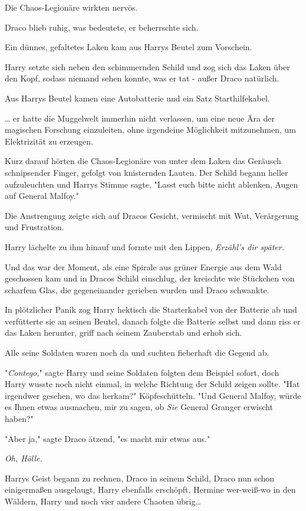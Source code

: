 {Die Chaos-Legionäre wirkten nervös.

Draco blieb ruhig, was bedeutete, er beherrschte sich.

Ein dünnes, gefaltetes Laken kam aus Harrys Beutel zum Vorschein.

Harry setzte sich neben den schimmernden Schild und zog sich das Laken über den Kopf, sodass niemand sehen konnte, was er tat - außer Draco natürlich.

Aus Harrys Beutel kamen eine Autobatterie und ein Satz Starthilfekabel.

… er hatte die Muggelwelt immerhin nicht verlassen, um eine neue Ära der magischen Forschung einzuleiten, ohne irgendeine Möglichkeit mitzunehmen, um Elektrizität zu erzeugen.

Kurz darauf hörten die Chaos-Legionäre von unter dem Laken das Geräusch schnipsender Finger, gefolgt von knisternden Lauten. Der Schild begann heller aufzuleuchten und Harrys Stimme sagte, "Lasst euch bitte nicht ablenken, Augen auf General Malfoy."

Die Anstrengung zeigte sich auf Dracos Gesicht, vermischt mit Wut, Verärgerung und Frustration.

Harry lächelte zu ihm hinauf und formte mit den Lippen, \emph{Erzähl's dir später.}

Und das war der Moment, als eine Spirale aus grüner Energie aus dem Wald geschossen kam und in Dracos Schild einschlug, der kreischte wie Stückchen von scharfem Glas, die gegeneinander gerieben wurden und Draco schwankte.

In plötzlicher Panik zog Harry hektisch die Starterkabel von der Batterie ab und verfütterte sie an seinen Beutel, danach folgte die Batterie selbst und dann riss er das Laken herunter, griff nach seinem Zauberstab und erhob sich.

Alle seine Soldaten waren noch da und suchten fieberhaft die Gegend ab.

"\emph{Contego,}" sagte Harry und seine Soldaten folgten dem Beispiel sofort, doch Harry wusste noch nicht einmal, in welche Richtung der Schild zeigen sollte. "Hat irgendwer gesehen, wo das herkam?" Köpfeschütteln. "Und General Malfoy, würde es Ihnen etwas ausmachen, mir zu sagen, ob \emph{Sie} General Granger erwischt haben?"

"Aber ja," sagte Draco ätzend, "es macht mir etwas aus."

\emph{Oh, Hölle.}

Harrys Geist begann zu rechnen, Draco in seinem Schild, Draco nun schon einigermaßen ausgelaugt, Harry ebenfalls erschöpft, Hermine wer-weiß-wo in den Wäldern, Harry und noch vier andere Chaoten übrig…

}
